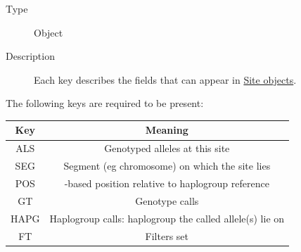 \begin{description}
\item[Type]
Object
\item[Description]
Each key describes the fields that can appear in
\protect\hyperlink{site_obj}{Site objects}.
\end{description}

The following keys are required to be present:

\begin{longtable}[]{@{}cc@{}}
\toprule
\begin{minipage}[b]{0.16\columnwidth}\centering
Key\strut
\end{minipage} & \begin{minipage}[b]{0.64\columnwidth}\centering
Meaning\strut
\end{minipage}\tabularnewline
\midrule
\endhead
\begin{minipage}[t]{0.16\columnwidth}\centering
ALS\strut
\end{minipage} & \begin{minipage}[t]{0.64\columnwidth}\centering
Genotyped alleles at this site\strut
\end{minipage}\tabularnewline
\begin{minipage}[t]{0.16\columnwidth}\centering
SEG\strut
\end{minipage} & \begin{minipage}[t]{0.64\columnwidth}\centering
Segment (eg chromosome) on which the site lies\strut
\end{minipage}\tabularnewline
\begin{minipage}[t]{0.16\columnwidth}\centering
POS\strut
\end{minipage} & \begin{minipage}[t]{0.64\columnwidth}\centering
1-based position relative to haplogroup reference\strut
\end{minipage}\tabularnewline
\begin{minipage}[t]{0.16\columnwidth}\centering
GT\strut
\end{minipage} & \begin{minipage}[t]{0.64\columnwidth}\centering
Genotype calls\strut
\end{minipage}\tabularnewline
\begin{minipage}[t]{0.16\columnwidth}\centering
HAPG\strut
\end{minipage} & \begin{minipage}[t]{0.64\columnwidth}\centering
Haplogroup calls: haplogroup the called allele(s) lie on\strut
\end{minipage}\tabularnewline
\begin{minipage}[t]{0.16\columnwidth}\centering
FT\strut
\end{minipage} & \begin{minipage}[t]{0.64\columnwidth}\centering
Filters set\strut
\end{minipage}\tabularnewline
\bottomrule
\end{longtable}

